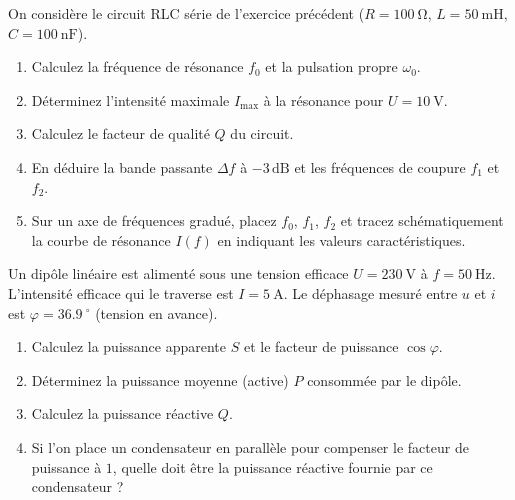 \documentclass[11pt]{article}
\providecommand{\degree}{^{\circ}}
\begin{document}
\begin{exercice}
On considère le circuit RLC série de l'exercice précédent ($R = \SI{100}{\ohm}$, $L = \SI{50}{\milli\henry}$, $C = \SI{100}{\nano\farad}$).
\begin{enumerate}
    \item Calculez la fréquence de résonance $f_0$ et la pulsation propre $\omega_0$.
    \item Déterminez l'intensité maximale $I_{\text{max}}$ à la résonance pour $U = \SI{10}{\volt}$.
    \item Calculez le facteur de qualité $Q$ du circuit.
    \item En déduire la bande passante $\Delta f$ à $-3\,\text{dB}$ et les fréquences de coupure $f_1$ et $f_2$.
    \item Sur un axe de fréquences gradué, placez $f_0$, $f_1$, $f_2$ et tracez schématiquement la courbe de résonance $I(f)$ en indiquant les valeurs caractéristiques.
\end{enumerate}
\end{exercice}

\begin{exercice}
Un dipôle linéaire est alimenté sous une tension efficace $U = \SI{230}{\volt}$ à $f = \SI{50}{\hertz}$. L'intensité efficace qui le traverse est $I = \SI{5}{\ampere}$. Le déphasage mesuré entre $u$ et $i$ est $\varphi = \SI{36,9}{\degree}$ (tension en avance).
\begin{enumerate}
    \item Calculez la puissance apparente $S$ et le facteur de puissance $\cos\varphi$.
    \item Déterminez la puissance moyenne (active) $P$ consommée par le dipôle.
    \item Calculez la puissance réactive $Q$.
    \item Si l'on place un condensateur en parallèle pour compenser le facteur de puissance à $1$, quelle doit être la puissance réactive fournie par ce condensateur ?
\end{enumerate}
\end{exercice}
\end{document}
